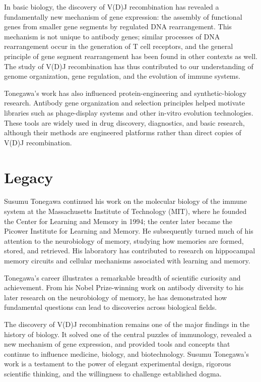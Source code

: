 In basic biology, the discovery of V(D)J recombination has revealed a fundamentally new mechanism of gene expression: the assembly of functional genes from smaller gene segments by regulated DNA rearrangement. This mechanism is not unique to antibody genes; similar processes of DNA rearrangement occur in the generation of T cell receptors, and the general principle of gene segment rearrangement has been found in other contexts as well. The study of V(D)J recombination has thus contributed to our understanding of genome organization, gene regulation, and the evolution of immune systems.

Tonegawa's work has also influenced protein-engineering and synthetic-biology research. Antibody gene organization and selection principles helped motivate libraries such as phage-display systems and other in-vitro evolution technologies. These tools are widely used in drug discovery, diagnostics, and basic research, although their methods are engineered platforms rather than direct copies of V(D)J recombination.

\section{Legacy}

Susumu Tonegawa continued his work on the molecular biology of the immune system at the Massachusetts Institute of Technology (MIT), where he founded the Center for Learning and Memory in 1994; the center later became the Picower Institute for Learning and Memory. He subsequently turned much of his attention to the neurobiology of memory, studying how memories are formed, stored, and retrieved. His laboratory has contributed to research on hippocampal memory circuits and cellular mechanisms associated with learning and memory.

Tonegawa's career illustrates a remarkable breadth of scientific curiosity and achievement. From his Nobel Prize-winning work on antibody diversity to his later research on the neurobiology of memory, he has demonstrated how fundamental questions can lead to discoveries across biological fields.

The discovery of V(D)J recombination remains one of the major findings in the history of biology. It solved one of the central puzzles of immunology, revealed a new mechanism of gene expression, and provided tools and concepts that continue to influence medicine, biology, and biotechnology. Susumu Tonegawa's work is a testament to the power of elegant experimental design, rigorous scientific thinking, and the willingness to challenge established dogma.


